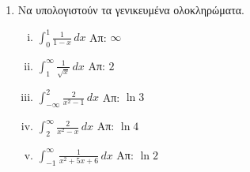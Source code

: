 \begin{enumerate}
  \item Να υπολογιστούν τα γενικευμένα ολοκληρώματα.
    \begin{enumerate}[i)]
      \item $ \int _{0}^{1} \frac{1}{1-x} \,{dx} $ \hfill Απ: $ \infty $ 
      \item $ \int _{1}^{\infty} \frac{1}{\sqrt{x}} \,{dx} $ \hfill Απ: $2$ 
      \item $ \int _{- \infty}^{2} \frac{2}{x^{2}-1} \,{dx} $ \hfill Απ: $ \ln{3}$ 
      \item $ \int _{2}^{\infty} \frac{2}{x^{2}-x} \,{dx} $ \hfill Απ: $ \ln{4}$ 
      \item $ \int _{-1}^{\infty} \frac{1}{x^{2}+5x+6} \,{dx} $ \hfill Απ: $ \ln{2}$ 
    \end{enumerate}
\end{enumerate}





